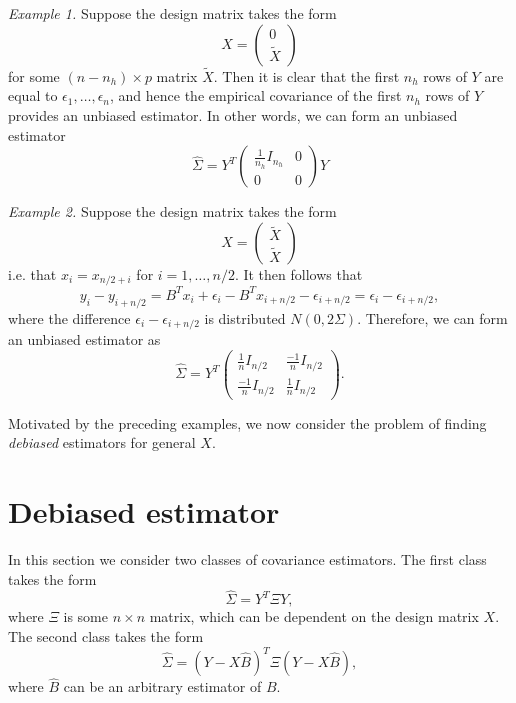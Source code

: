 \documentclass[12pt]{article}
\begin{document}
\emph{Example 1.} Suppose the design matrix takes the form
\begin{equation}\label{example1}
X = \begin{pmatrix} 0 \\ \tilde{X} \end{pmatrix}
\end{equation}
for some $(n-n_h) \times p$ matrix $\tilde{X}$.  Then it is clear that
the first $n_h$ rows of $Y$ are equal to
$\epsilon_1,\hdots,\epsilon_n$, and hence the empirical covariance of
the first $n_h$ rows of $Y$ provides an unbiased estimator.
In other words, we can form an unbiased estimator
\[
\hat{\Sigma} = Y^T \begin{pmatrix}\frac{1}{n_h}I_{n_h} & 0 \\ 0 & 0\end{pmatrix} Y
\]

\emph{Example 2.} Suppose the design matrix takes the form
\[
X = \begin{pmatrix} \tilde{X} \\ \tilde{X}\end{pmatrix}
\]
i.e. that $x_i = x_{n/2 + i}$ for $i = 1,\hdots, n/2$.
It then follows that
\begin{equation}\label{example2}
y_i - y_{i + n/2} = B^Tx_i  + \epsilon_i - B^Tx_{i+n/2} - \epsilon_{i + n/2}=\epsilon_i - \epsilon_{i+n/2},
\end{equation}
where the difference $\epsilon_i - \epsilon_{i + n/2}$ is distributed $N(0, 2\Sigma)$.
Therefore, we can form an unbiased estimator as
\[
\hat{\Sigma} = Y^T \begin{pmatrix} \frac{1}{n}I_{n/2} & \frac{-1}{n}I_{n/2} \\ \frac{-1}{n}I_{n/2} & \frac{1}{n}I_{n/2}\end{pmatrix}.
\]

Motivated by the preceding examples, we now consider the problem of finding \emph{debiased} estimators for general $X$.

\section{Debiased estimator}

In this section we consider two classes of covariance estimators.
The first class takes the form
\[
\hat{\Sigma} = Y^T \Xi Y,
\]
where $\Xi$ is some $n \times n$ matrix, which can be dependent on the
design matrix $X$.
The second class takes the form
\[
\hat{\Sigma} = (Y - X\hat{B})^T \Xi (Y - X\hat{B}),
\]
where $\hat{B}$ can be an arbitrary estimator of $B$.
\end{document}

